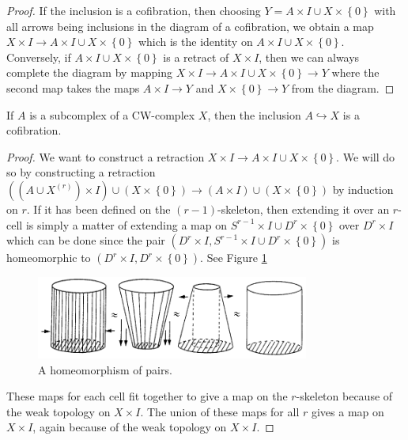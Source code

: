 \begin{proof}
    If the inclusion is a cofibration, then choosing
    $Y = A \times I \cup  X \times \left\{ 0 \right\} $ 
    with all arrows being inclusions in the
    diagram of a cofibration, we obtain a map
    $X \times I \to A \times I \cup  X \times \left\{ 0 \right\} $ 
    which is the identity on
    $A \times I \cup  X \times \left\{ 0 \right\} $.\\
    Conversely, if $A \times I \cup  X \times \left\{ 0 \right\} $ 
    is a retract of $X \times I$, then
    we can always complete the diagram by
    mapping $X \times I \to 
    A \times I \cup  X \times  \left\{ 0 \right\} 
    \to Y$ where the second map
    takes the maps $A \times I \to Y$ and
    $X \times \left\{ 0 \right\} \to Y$ from the diagram.
\end{proof}

\begin{corollary}\label{Cor:Subcomplex-Cofibration}
    If $A$ is a subcomplex of a CW-complex $X$, then
    the inclusion $A \hookrightarrow X$ is a cofibration.
\end{corollary}

\begin{proof}
    We want to construct a retraction
    $X \times I \to A \times I \cup  X \times \left\{ 0 \right\} $.
    We will do so by constructing a retraction
    $\left( \left( A \cup X^{(r)}  \right)\times I  \right) \cup 
    \left( X \times \left\{ 0 \right\}  \right) 
    \to \left( A \times I \right) \cup \left( X \times 
    \left\{ 0 \right\} \right) $ by induction on $r$.
    If it has been defined on the
    $(r-1)$-skeleton, then extending it over an
    $r$-cell is simply a matter of extending a map
    on $S^{r-1} \times I \cup D^{r} \times \left\{ 0 \right\} $ 
    over $D^{r} \times I$ which can be done
    since the pair
    $\left( D^{r} \times I, S^{r-1} \times I
    \cup D^{r} \times \left\{ 0 \right\} \right) $ is homeomorphic
    to $\left( D^{r} \times I, D^{r}\times \left\{ 0 \right\} 
    \right) $.
    See Figure \ref{fig:DUWUWUJK122-png}

    \begin{figure}[htpb]
        \centering
        \includegraphics[width=0.8\textwidth]{Figures/DUWUWUJK122.png}
        \caption{A homeomorphism of pairs.}
        \label{fig:DUWUWUJK122-png}
    \end{figure}
    These maps for each cell fit together to
    give a map on the $r$-skeleton because of the
    weak topology on $X \times I$. The union of these
    maps for all $r$ gives a map on $X \times I$, again because
    of the weak topology on $X \times I$.
\end{proof}

